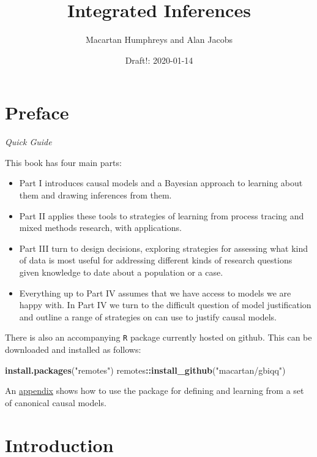 \documentclass[12pt,]{book}
\title{Integrated Inferences}
\author{Macartan Humphreys and Alan Jacobs}
\date{Draft!: 2020-01-14}
\newenvironment{Shaded}{\begin{snugshade}}{\end{snugshade}}
\newcommand{\KeywordTok}[1]{\textcolor[rgb]{0.13,0.29,0.53}{\textbf{#1}}}
\newcommand{\NormalTok}[1]{#1}
\newcommand{\OperatorTok}[1]{\textcolor[rgb]{0.81,0.36,0.00}{\textbf{#1}}}
\newcommand{\StringTok}[1]{\textcolor[rgb]{0.31,0.60,0.02}{#1}}
\begin{document}
\maketitle

{
\setcounter{tocdepth}{1}
\tableofcontents
}
\hypertarget{preface}{%
\chapter*{Preface}\label{preface}}

\emph{Quick Guide}

This book has four main parts:

\begin{itemize}
\item
  Part I introduces causal models and a Bayesian approach to learning about them and drawing inferences from them.
\item
  Part II applies these tools to strategies of learning from process tracing and mixed methods research, with applications.
\item
  Part III turn to design decisions, exploring strategies for assessing what kind of data is most useful for addressing different kinds of research questions given knowledge to date about a population or a case.
\item
  Everything up to Part IV assumes that we have access to models we are happy with. In Part IV we turn to the difficult question of model justification and outline a range of strategies on can use to justify causal models.
\end{itemize}

There is also an accompanying \texttt{R} package currently hosted on github. This can be downloaded and installed as follows:

\begin{Shaded}
\begin{Highlighting}[]
\KeywordTok{install.packages}\NormalTok{(}\StringTok{"remotes"}\NormalTok{)}
\NormalTok{remotes}\OperatorTok{::}\KeywordTok{install_github}\NormalTok{(}\StringTok{"macartan/gbiqq"}\NormalTok{)}
\end{Highlighting}
\end{Shaded}

An \protect\hyperlink{examplesappendix}{appendix} shows how to use the package for defining and learning from a set of canonical causal models.

\hypertarget{intro}{%
\chapter{Introduction}\label{intro}}
\end{document}

